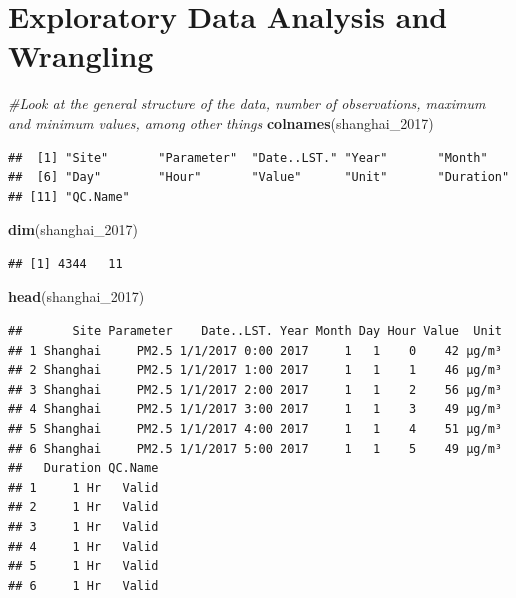 \documentclass[12pt,]{article}
\newenvironment{Shaded}{\begin{snugshade}}{\end{snugshade}}
\newcommand{\KeywordTok}[1]{\textcolor[rgb]{0.13,0.29,0.53}{\textbf{#1}}}
\newcommand{\DecValTok}[1]{\textcolor[rgb]{0.00,0.00,0.81}{#1}}
\newcommand{\CommentTok}[1]{\textcolor[rgb]{0.56,0.35,0.01}{\textit{#1}}}
\newcommand{\NormalTok}[1]{#1}
\begin{document}
\newpage

\section{Exploratory Data Analysis and
Wrangling}\label{exploratory-data-analysis-and-wrangling}

\begin{Shaded}
\begin{Highlighting}[]
\CommentTok{#Look at the general structure of the data, number of observations, maximum and minimum values, among other things}
\KeywordTok{colnames}\NormalTok{(shanghai_}\DecValTok{2017}\NormalTok{)}
\end{Highlighting}
\end{Shaded}

\begin{verbatim}
##  [1] "Site"       "Parameter"  "Date..LST." "Year"       "Month"     
##  [6] "Day"        "Hour"       "Value"      "Unit"       "Duration"  
## [11] "QC.Name"
\end{verbatim}

\begin{Shaded}
\begin{Highlighting}[]
\KeywordTok{dim}\NormalTok{(shanghai_}\DecValTok{2017}\NormalTok{)}
\end{Highlighting}
\end{Shaded}

\begin{verbatim}
## [1] 4344   11
\end{verbatim}

\begin{Shaded}
\begin{Highlighting}[]
\KeywordTok{head}\NormalTok{(shanghai_}\DecValTok{2017}\NormalTok{)}
\end{Highlighting}
\end{Shaded}

\begin{verbatim}
##       Site Parameter    Date..LST. Year Month Day Hour Value  Unit
## 1 Shanghai     PM2.5 1/1/2017 0:00 2017     1   1    0    42 µg/m³
## 2 Shanghai     PM2.5 1/1/2017 1:00 2017     1   1    1    46 µg/m³
## 3 Shanghai     PM2.5 1/1/2017 2:00 2017     1   1    2    56 µg/m³
## 4 Shanghai     PM2.5 1/1/2017 3:00 2017     1   1    3    49 µg/m³
## 5 Shanghai     PM2.5 1/1/2017 4:00 2017     1   1    4    51 µg/m³
## 6 Shanghai     PM2.5 1/1/2017 5:00 2017     1   1    5    49 µg/m³
##   Duration QC.Name
## 1     1 Hr   Valid
## 2     1 Hr   Valid
## 3     1 Hr   Valid
## 4     1 Hr   Valid
## 5     1 Hr   Valid
## 6     1 Hr   Valid
\end{verbatim}
\end{document}
